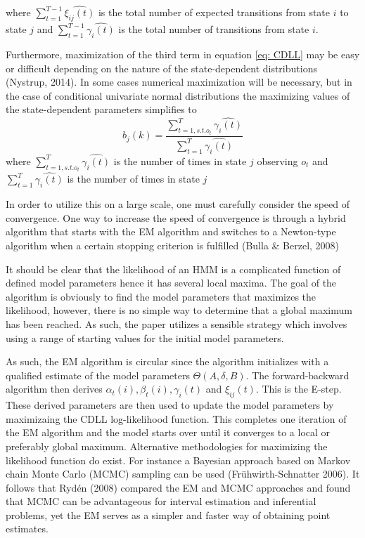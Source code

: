 where $\sum_{t=1}^{T-1}\hat{\xi_{ij}(t)}$ is the total number of expected transitions from state $i$ to state $j$ and $\sum_{t=1}^{T-1}\hat{\gamma_i(t)}$ is the total number of transitions from state $i$.

Furthermore, maximization of the third term in equation \ref{eq: CDLL} may be easy or difficult depending on the nature of the state-dependent distributions (Nystrup, 2014). In some cases numerical maximization will be necessary, but in the case of conditional univariate normal
distributions the maximizing values of the state-dependent parameters simplifies to
\begin{equation}
    b_j(k) = \frac{\sum_{t=1, s.t.o_t}^T\hat{\gamma_i(t)}}{\sum_{t=1}^T\hat{\gamma_i(t)}}    
\end{equation}
where $\sum_{t=1, s.t.o_t}^T\hat{\gamma_i(t)}$ is the number of times in state $j$ observing $o_t$ and $\sum_{t=1}^T\hat{\gamma_i(t)}$ is the number of times in state $j$

In order to utilize this on a large scale, one must carefully consider the speed of convergence. One way to increase the speed of convergence is through a hybrid algorithm that starts with the EM algorithm and switches to a Newton-type algorithm when a certain stopping criterion is fulfilled (Bulla \& Berzel, 2008)

It should be clear that the likelihood of an HMM is a complicated function of defined model parameters hence it has several local maxima. The goal of the algorithm is obviously to find the model parameters that maximizes the likelihood, however, there is no simple way to determine that a global maximum has been reached. As such, the paper utilizes a sensible strategy which involves using a range of starting values for the initial model parameters.

As such, the EM algorithm is circular since the algorithm initializes with a qualified estimate of the model parameters $\Theta(A,\delta, B)$. The forward-backward algorithm then derives $\alpha_t(i), \beta_t(i), \gamma_i(t)$ and $\xi_{ij}(t)$. This is the E-step. These derived parameters are then used to update the model parameters by maximizaing the CDLL log-likelihood function. This completes one iteration of the EM algorithm and the model starts over until it converges to a local or preferably global maximum. Alternative methodologies for maximizing the likelihood function do exist. For instance a Bayesian approach based on Markov chain Monte Carlo (MCMC) sampling can be used (Frühwirth-Schnatter 2006). It follows that Rydén (2008) compared the EM and MCMC approaches and found that MCMC can be advantageous for interval estimation and inferential problems, yet the EM serves as a simpler and faster way of obtaining point estimates.

